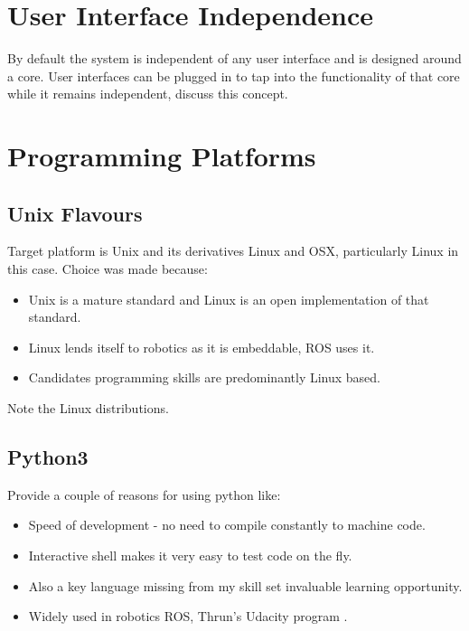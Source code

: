 \section{User Interface Independence}
By default the system is independent of any user interface and is designed around a core. User interfaces can be plugged in to tap into the functionality of that core while it remains independent, discuss this concept.

\newpage


\section{Programming Platforms}

\subsection{Unix Flavours}
Target platform is Unix and its derivatives Linux and OSX, particularly Linux in this case. Choice was made because:

\begin{itemize}
\item Unix is a mature standard and Linux is an open implementation of that standard.
\item Linux lends itself to robotics as it is embeddable, ROS uses it.
\item Candidates programming skills are predominantly Linux based.
\end{itemize} 

Note the Linux distributions.

\subsection{Python3}
Provide a couple of reasons for using python like:

\begin{itemize}
\item Speed of development - no need to compile constantly to machine code.
\item Interactive shell makes it very easy to test code on the fly.
\item Also a key language missing from my skill set invaluable learning opportunity.
\item Widely used in robotics ROS, Thrun's Udacity program .
\end{itemize} 

